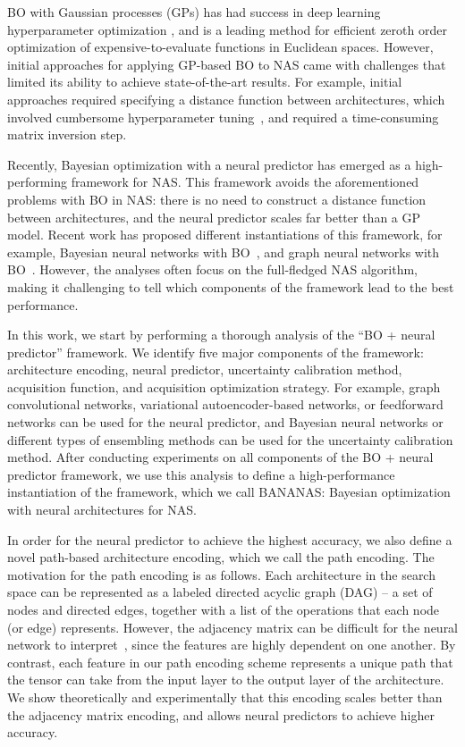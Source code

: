 \documentclass[11pt]{article}
\numberwithin{equation}{section}
\numberwithin{figure}{section}
\theoremstyle{plain}
\theoremstyle{definition}
\begin{document}
BO with Gaussian processes (GPs) has had success in deep learning 
hyperparameter optimization \cite{vizier, bohb},
and is a leading method for efficient zeroth order
optimization of expensive-to-evaluate functions in Euclidean spaces.
However, initial approaches for applying GP-based BO to NAS came with
challenges that limited its ability to achieve state-of-the-art results. 
For example, initial approaches required specifying a distance function
between architectures, which involved cumbersome hyperparameter 
tuning~\cite{nasbot, auto-keras}, and required a time-consuming matrix
inversion step.

Recently, Bayesian optimization with a neural
predictor has emerged as a high-performing framework for NAS.
This framework avoids the aforementioned problems with BO in NAS:
there is no need to construct a distance function between architectures,
and the neural predictor scales far better than a GP model.
Recent work has proposed different instantiations
of this framework, for example, Bayesian neural networks with 
BO~\cite{springenberg2016bayesian}, and
graph neural networks with BO~\cite{shi2019multi, ma2019deep}.
However, the analyses often focus on the 
full-fledged NAS algorithm,
making it challenging to tell which components of the
framework lead to the best performance.

In this work, we start by performing a thorough analysis of the 
``BO + neural predictor'' framework.
We identify five major components of the framework: architecture encoding, 
neural predictor,
uncertainty calibration method, acquisition function, 
and acquisition optimization strategy.
For example, graph convolutional networks, 
variational autoencoder-based networks,
or feedforward networks can be used for the neural predictor, and
Bayesian neural networks or different types of ensembling methods can be used 
for the uncertainty calibration method.
After conducting experiments on all components of the BO + neural predictor
framework, we use this analysis to define a high-performance instantiation
of the framework, which we call
BANANAS: Bayesian optimization with
neural architectures for NAS.

In order for the neural predictor to achieve the highest accuracy, 
we also define a novel path-based architecture encoding,
which we call the path encoding.
The motivation for the path encoding is as follows.
Each architecture in the search space can be represented as a labeled 
directed acyclic graph (DAG)  -- a set of nodes and directed edges,
together with a list of the operations that each node (or edge) represents.
However, the adjacency matrix can be difficult for the neural network to
interpret~\cite{zhou2018graph}, since the features are highly dependent on
one another. By contrast, each feature in our path encoding scheme represents
a unique path that the tensor can take from the input layer to the output
layer of the  architecture.
We show theoretically and experimentally that this encoding 
scales better than the adjacency matrix encoding, and allows neural predictors
to achieve higher accuracy.
\end{document}

